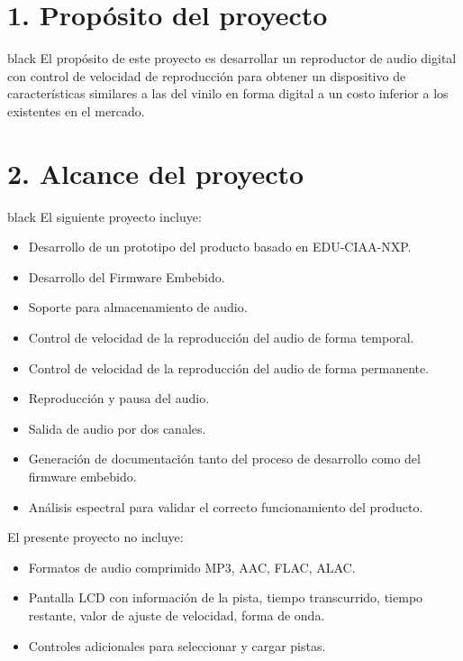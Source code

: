\documentclass[11pt]{charter}
\begin{document}
\section{1. Propósito del proyecto}
\label{sec:proposito}

\begin{consigna}{black}
El propósito de este proyecto es desarrollar un reproductor de audio digital con control de velocidad de reproducción para obtener un dispositivo de características similares a las del vinilo en forma digital a un costo inferior a los existentes en el mercado. 
\end{consigna}

\section{2. Alcance del proyecto}
\label{sec:alcance}

\begin{consigna}{black}
El siguiente proyecto incluye:
\begin{itemize}
\item Desarrollo de un prototipo del producto basado en EDU-CIAA-NXP.
\item Desarrollo del Firmware Embebido.
\item Soporte para almacenamiento de audio.
\item Control de velocidad de la reproducción del audio de forma temporal.
\item Control de velocidad de la reproducción del audio de forma permanente.
\item Reproducción y pausa del audio.
\item Salida de audio por dos canales.
\item Generación de documentación tanto del proceso de desarrollo como del firmware
embebido.
\item Análisis espectral para validar el correcto funcionamiento del producto.
\end{itemize}

El presente proyecto no incluye:
\begin{itemize}
\item Formatos de audio comprimido MP3, AAC, FLAC, ALAC.
\item Pantalla LCD con información de la pista, tiempo transcurrido, tiempo restante, valor de ajuste de velocidad, forma de onda.
\item Controles adicionales para seleccionar y cargar pistas.
\end{itemize}
\end{consigna}
\end{document}
